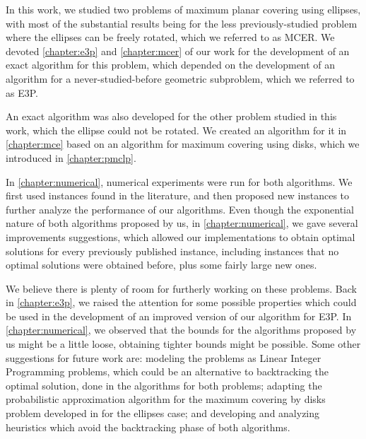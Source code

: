 In this work, we studied two problems of maximum planar covering using ellipses, with most of the substantial results being for the less previously-studied problem where the ellipses can be freely rotated, which we referred to as MCER. We devoted \autoref{chapter:e3p} and \autoref{chapter:mcer} of our work for the development of an exact algorithm for this problem, which depended on the development of an algorithm for a never-studied-before geometric subproblem, which we referred to as E3P. 

An exact algorithm was also developed for the other problem studied in this work, which the ellipse could not be rotated. We created an algorithm for it in \autoref{chapter:mce} based on an algorithm for maximum covering using disks, which we introduced in \autoref{chapter:pmclp}.

In \autoref{chapter:numerical}, numerical experiments were run for both algorithms. We first used instances found in the literature, and then proposed new instances to further analyze the performance of our algorithms.
Even though the exponential nature of both algorithms proposed by us, 
in \autoref{chapter:numerical}, we gave several improvements suggestions, which allowed our implementations to obtain optimal solutions for every previously published instance, including instances that no optimal solutions were obtained before, plus some fairly large new ones.


We believe there is plenty of room for furtherly working on these problems.
Back in \autoref{chapter:e3p}, we raised the attention for some possible properties which could be used in the development of an improved version of our algorithm for E3P.
In \autoref{chapter:numerical}, we observed that the bounds for the algorithms proposed by us might be a little loose, obtaining tighter bounds might be possible.
Some other suggestions for future work are: modeling the problems as Linear Integer Programming problems, which could be an alternative to backtracking the optimal solution, done in the algorithms for both problems; adapting the probabilistic  approximation algorithm for the maximum covering by disks problem developed in  for the ellipses case; and developing and analyzing heuristics which avoid the backtracking phase of both algorithms.
